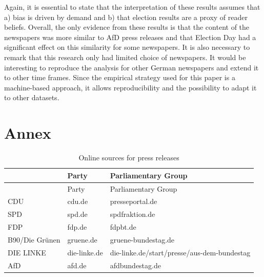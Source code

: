 \documentclass[
  12pt,
]{article}
\begin{document}
Again, it is essential to state that the interpretation of these results
assumes that a) bias is driven by demand and b) that election results
are a proxy of reader beliefs. Overall, the only evidence from these
results is that the content of the newspapers was more similar to AfD
press releases and that Election Day had a significant effect on this
similarity for some newspapers. It is also necessary to remark that this
research only had limited choice of newspapers. It would be interesting
to reproduce the analysis for other German newspapers and extend it to
other time frames. Since the empirical strategy used for this paper is a
machine-based approach, it allows reproducibility and the possibility to
adapt it to other datasets.

\newpage

\hypertarget{annex}{%
\section{Annex}\label{annex}}

\begin{longtable}[]{@{}lll@{}}
\caption{Online sources for press releases
\label{table:press_releases_sources}}\tabularnewline
\toprule
& Party & Parliamentary Group \\
\midrule
\endfirsthead
\toprule
& Party & Parliamentary Group \\
\midrule
\endhead
CDU & cdu.de & presseportal.de \\
SPD & spd.de & spdfraktion.de \\
FDP & fdp.de & fdpbt.de \\
B90/Die Grünen & gruene.de & gruene-bundestag.de \\
DIE LINKE & die-linke.de &
die-linke.de/start/presse/aus-dem-bundestag \\
AfD & afd.de & afdbundestag.de \\
\bottomrule
\end{longtable}
\end{document}
